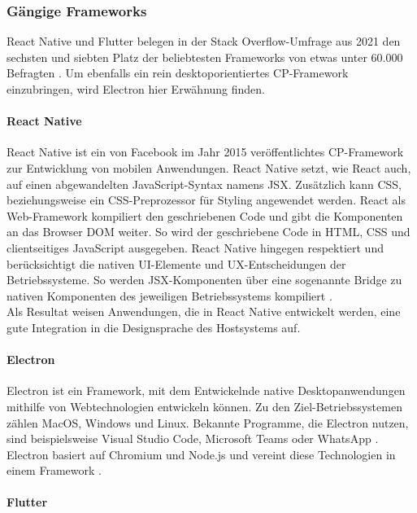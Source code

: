 \documentclass[a4paper]{scrartcl}
\begin{document}
\subsubsection{Gängige Frameworks}

React Native und Flutter belegen in der Stack Overflow-Umfrage aus 2021 den sechsten und siebten Platz der beliebtesten Frameworks von etwas unter 60.000 Befragten \autocite{stackoverflow_2021}. Um ebenfalls ein rein desktoporientiertes CP-Framework einzubringen, wird Electron hier Erwähnung finden.

\paragraph{React Native}

React Native ist ein von Facebook im Jahr 2015 veröffentlichtes CP-Framework zur Entwicklung von mobilen Anwendungen. React Native setzt, wie React auch, auf einen abgewandelten JavaScript-Syntax namens JSX. Zusätzlich kann CSS, beziehungsweise ein CSS-Preprozessor für Styling angewendet werden. React als Web-Framework kompiliert den geschriebenen Code und gibt die Komponenten an das Browser DOM weiter. So wird der geschriebene Code in HTML, CSS und clientseitiges JavaScript ausgegeben. React Native hingegen respektiert und berücksichtigt die nativen UI-Elemente und UX-Entscheidungen der Betriebssysteme. So werden JSX-Komponenten über eine sogenannte Bridge zu nativen Komponenten des jeweiligen Betriebssystems kompiliert \autocite[10f.]{React_Native_Danielsson}. \\
Als Resultat weisen Anwendungen, die in React Native entwickelt werden, eine gute Integration in die Designsprache des Hostsystems auf.

\paragraph{Electron}

Electron ist ein Framework, mit dem Entwickelnde native Desktopanwendungen mithilfe von Webtechnologien entwickeln können. Zu den Ziel-Betriebssystemen zählen MacOS, Windows und Linux. Bekannte Programme, die Electron nutzen, sind beispielsweise Visual Studio Code, Microsoft Teams oder WhatsApp \autocite{Electron.js}. Electron basiert auf Chromium und Node.js und vereint diese Technologien in einem Framework \autocite[Jasim 2017, zitiert nach][572]{Electron_Kredpattanakul}. \\

\paragraph{Flutter}
\end{document}

